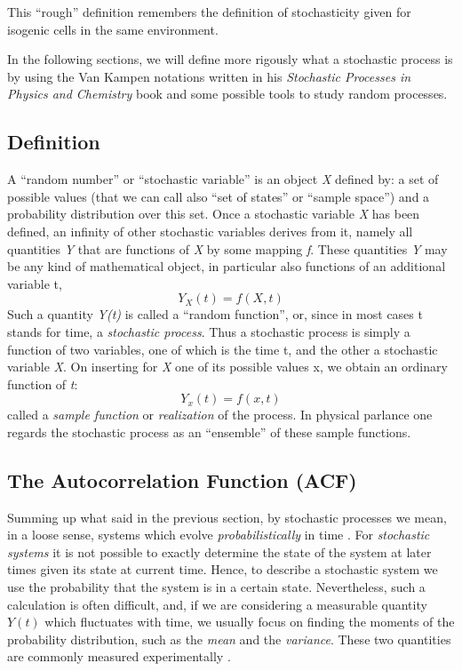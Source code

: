 \documentclass[12pt,a4paper]{report}
\begin{document}
This ``rough'' definition remembers the definition of stochasticity given for isogenic cells in the same environment. 

In the following sections, we will define more rigously what a stochastic process is by using the Van Kampen notations written in his \emph{Stochastic Processes in Physics and Chemistry} book \cite{VanKampenBook} and some possible tools to study random processes.


\subsection{Definition}
A ``random number'' or ``stochastic variable'' is an object \emph{X} defined by: a set of possible values (that we can call also ``set of states'' or ``sample space'') and a probability distribution over this set. Once a stochastic variable \emph{X} has been defined, an infinity of other stochastic variables derives from it, namely all quantities \emph{Y} that are functions of \emph{X} by some mapping \emph{f}. These quantities \emph{Y} may be any kind of mathematical object, in particular also functions of an additional variable t,
\begin{equation}
    Y_{X}(t) = f(X,t)
\end{equation}
Such a quantity \emph{Y(t)} is called a ``random function'', or, since in most cases t stands for time, a \emph{stochastic process}. Thus a stochastic process is simply a function of two variables, one of which is the time t, and the other a stochastic variable \emph{X}. On inserting for \emph{X} one of its possible values x, we obtain an ordinary function of \emph{t}: 
\begin{equation}
    Y_{x}(t) = f(x,t) 
\end{equation}
called a \emph{sample function} or \emph{realization} of the process. In physical parlance one regards the stochastic process as an ``ensemble'' of these sample functions.

\subsection{The Autocorrelation Function (ACF)}\label{ACFSubsection}
Summing up what said in the previous section, by stochastic processes we mean, in a loose sense, systems which evolve \emph{probabilistically} in time \cite{Hand}. For \emph{stochastic systems} it is not possible to exactly determine the state of the system at later times given its state at current time. Hence, to describe a stochastic system we use the probability that the system is in a certain state. Nevertheless, such a calculation is often difficult, and, if we are considering a measurable quantity $Y(t)$ which fluctuates with time, we usually focus on finding the moments of the probability distribution, such as the \emph{mean} and the \emph{variance}. These two quantities are commonly measured experimentally \cite{Brizi}.
\end{document}
